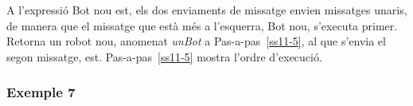 A l'expressió \textsf{Bot nou est}, els dos enviaments de missatge envien missatges unaris, de manera que el missatge que està més a l'esquerra, \textsf{Bot nou}, s'executa primer. Retorna un robot nou, anomenat \textsf{{\itshape unBot}} a Pas-a-pas~\ref{ss11-5}, al que s'envia el segon missatge, \textsf{est}. Pas-a-pas~\ref{ss11-5} mostra l'ordre d'execució.

\subsubsection*{Exemple 7}

